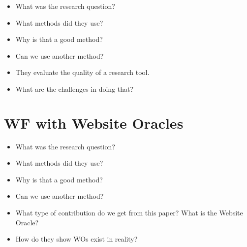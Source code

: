 \begin{frame}
  \begin{question}
    \begin{itemize}
      \item What was the research question?
      \item What methods did they use?
      \item Why is that a good method?
      \item Can we use another method?
    \end{itemize}
  \end{question}
\end{frame}

\begin{frame}
  \begin{question}
    \begin{itemize}
      \item They evaluate the quality of a research tool.
      \item What are the challenges in doing that?
    \end{itemize}
  \end{question}
\end{frame}

\section{WF with Website Oracles}

\begin{frame}
  \begin{question}
    \begin{itemize}
      \item What was the research question?
      \item What methods did they use?
      \item Why is that a good method?
      \item Can we use another method?
    \end{itemize}
  \end{question}
\end{frame}

\begin{frame}
  \begin{question}
    \begin{itemize}
      \item What type of contribution do we get from this paper?
        What is the Website Oracle?
      \item How do they show WOs exist in reality?
    \end{itemize}
  \end{question}
\end{frame}

